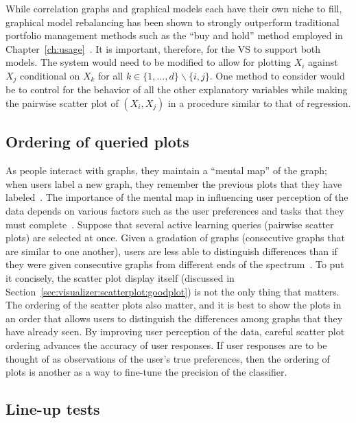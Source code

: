 While correlation graphs and graphical models each have their own niche to 
fill, graphical model rebalancing has been shown to strongly outperform 
traditional portfolio management methods such as the ``buy and hold'' method 
employed in Chapter~\ref{ch:usage}~\cite{liuh2016}. 
It is important, therefore, for the VS to 
support both models. The system would need to be modified to allow for plotting 
$X_i$ against $X_j$ conditional on $X_k$ for all $k\in\{1,...,d\} \backslash 
\{i,j\}$. One method to consider would be to control for the behavior of all 
the other explanatory variables while making the pairwise scatter plot of 
$(X_i,X_j)$ in a procedure similar to that of regression.

\subsection{Ordering of queried plots}
\label{sec:futurework:ordering}

As people interact with graphs, they maintain a ``mental map'' of the 
graph; when users label a new graph, they remember the previous plots that they
have labeled~\cite{federico2016}. The importance of the mental map in 
influencing user perception of the data depends on
various factors such as the user preferences and tasks that they must
complete~\cite{federico2016}. Suppose that several active learning queries 
(pairwise scatter plots) are selected at once. Given a gradation of graphs 
(consecutive
graphs that are similar to one another), users are less able to 
distinguish differences than if they were given consecutive graphs from 
different 
ends of the spectrum~\cite{federico2016}. To put it 
concisely, the scatter plot display itself (discussed in 
Section~\ref{sec:visualizer:scatterplot:goodplot}) is not the only thing that 
matters. The ordering of the scatter plots also matter, and it is best to show 
the plots in an order that allows users to distinguish the differences among 
graphs that they have already seen. By improving user perception of the data, 
careful scatter plot ordering advances the accuracy of user responses. If user 
responses are to be thought of as observations of the user's true preferences, 
then the ordering of plots is another as a way to fine-tune the precision of 
the classifier. 

\subsection{Line-up tests}
\label{sec:futurework:lineup}

